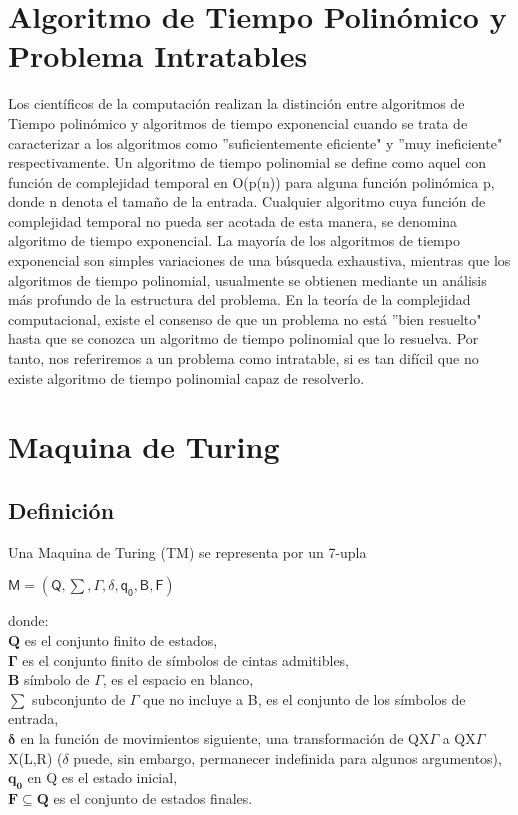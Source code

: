 \documentclass[12pt]{report}
\begin{document}
\section{Algoritmo de Tiempo Polinómico y Problema Intratables}
Los científicos de la computación realizan la distinción entre algoritmos de Tiempo polinómico y algoritmos de tiempo exponencial cuando se trata de caracterizar a los algoritmos como ''suficientemente eficiente" y ''muy ineficiente" respectivamente.
Un algoritmo de tiempo polinomial se define como aquel con función de complejidad temporal en O(p(n)) para alguna función polinómica p, donde n denota el tamaño de la entrada. Cualquier algoritmo cuya función de complejidad temporal no pueda ser acotada de esta manera, se denomina algoritmo de tiempo exponencial.
La mayoría de los algoritmos de tiempo exponencial son simples variaciones de una búsqueda exhaustiva, mientras que los algoritmos de tiempo polinomial, usualmente se obtienen mediante un análisis más profundo de la estructura del problema. En la teoría de la complejidad computacional, existe el consenso de que un problema no está ''bien resuelto" hasta que se conozca un algoritmo de tiempo polinomial que lo resuelva. Por tanto, nos referiremos a un problema como intratable, si es tan difícil que no existe algoritmo de tiempo polinomial capaz de resolverlo.

\section{Maquina de Turing}
\subsection{Definición}
Una Maquina de Turing (TM) se representa por un 7-upla\\
\begin{center}
$\mathsf{M = (Q,\sum,\Gamma,\delta,q_0,B,F)}$
\end{center}
donde: \\
$\mathbf{Q}$ es el conjunto finito de estados, \\
$\mathbf{\Gamma}$ es el conjunto finito de símbolos de cintas admitibles,\\
$\mathbf{B}$ símbolo de $\Gamma$, es el espacio en blanco, \\
$\mathbf{\sum}$ subconjunto de $\Gamma$ que no incluye a B, es el conjunto de los símbolos de entrada,\\
$\mathbf{\delta}$ en la función de movimientos siguiente, una transformación de QX$\Gamma$ a QX$\Gamma$X(L,R) ($\delta$ puede, sin embargo, permanecer indefinida para algunos argumentos),\\
$\mathbf{q_0}$ en Q es el estado inicial,\\
$\mathbf{F \subseteq Q}$ es el conjunto de estados finales.
\end{document}
